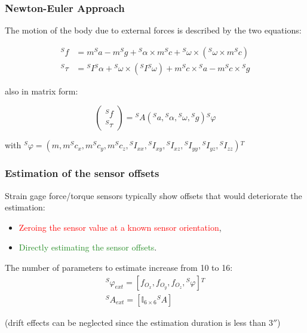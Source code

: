 \documentclass[usenames,dvipsnames]{beamer}
\begin{document}
\begin{frame}
 \frametitle{Newton-Euler Approach}

 The motion of the body due to external forces is described by the two equations:

 \begin{align}
  {}^S f    & = m {}^S a - m {}^S g + {}^S \alpha \times m {}^S c + {}^S \omega \times ({}^S \omega \times m {}^S c)           \\
  {}^S \tau & = {}^S I {}^S \alpha + {}^S \omega \times ({}^S I {}^S \omega) + m {}^S c \times {}^S a - m {}^S c \times {}^S g
 \end{align}

 also in matrix form:

 \begin{equation}
  \begin{pmatrix}
   {}^S f    \\
   {}^S \tau
  \end{pmatrix}
  = {}^S A({}^S a, {}^S \alpha, {}^S \omega, {}^S g) {}^S \varphi
 \end{equation}

 with ${}^S \varphi = (m, m {}^S c_x, m {}^S c_y, m {}^S c_z, {}^S I_{xx}, {}^S I_{xy}, {}^S I_{xz}, {}^S I_{yy}, {}^S I_{yz}, {}^S I_{zz}) {}^T$
\end{frame}

\begin{frame}
 \frametitle{Estimation of the sensor offsets}
 Strain gage force/torque sensors typically show offsets that would deteriorate the estimation:
 \begin{itemize}
  \item \textcolor{red}{Zeroing the sensor value at a known sensor orientation},
  \item \textcolor{ForestGreen}{Directly estimating the sensor offsets}.
 \end{itemize}

The number of parameters to estimate increase from 10 to 16:
\begin{gather}
  {}^S \varphi_{ext} = [f_{O_x}, f_{O_y}, f_{O_z}, {}^S \varphi] {}^T \\
  {}^S A_{ext} = [\mathbb{I}_{6 \times 6} {}^S A]
\end{gather}

 {\footnotesize (drift effects can be neglected since the estimation duration is less than $3 \second$)}
\end{frame}
\end{document}
